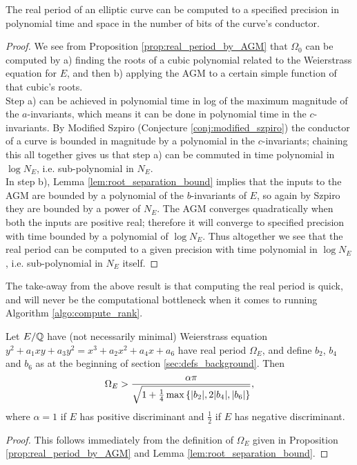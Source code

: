 \begin{corollary}[ABC]\label{cor:real_period_time_complexity}
The real period of an elliptic curve can be computed to a specified precision in polynomial time and space in the number of bits of the curve's conductor.
\end{corollary}
\begin{proof}
We see from Proposition \ref{prop:real_period_by_AGM} that $\Omega_0$ can be computed by a) finding the roots of a cubic polynomial related to the Weierstrass equation for $E$, and then b) applying the AGM to a certain simple function of that cubic's roots. \\

Step a) can be achieved in polynomial time in log of the maximum magnitude of the $a$-invariants, which means it can be done in polynomial time in the $c$-invariants. By Modified Szpiro (Conjecture \ref{conj:modified_szpiro}) the conductor of a curve is bounded in magnitude by a polynomial in the $c$-invariants; chaining this all together gives us that step a) can be commuted in time polynomial in $\log N_E$, i.e. sub-polynomial in $N_E$. \\

In step b), Lemma \ref{lem:root_separation_bound} implies that the inputs to the AGM are bounded by a polynomial of the $b$-invariants of $E$, so again by Szpiro they are bounded by a power of $N_E$. The AGM converges quadratically when both the inputs are positive real; therefore it will converge to specified precision with time bounded by a polynomial of $\log N_E$. Thus altogether we see that the real period can be computed to a given precision with time polynomial in $\log N_E$, i.e. sub-polynomial in $N_E$ itself.
\end{proof}

The take-away from the above result is that computing the real period is quick, and will never be the computational bottleneck when it comes to running Algorithm \ref{algo:compute_rank}. \\

\begin{corollary}[S.]\label{ineq:Omega_bn_bound}
Let $E/\mathbb{Q}$ have (not necessarily minimal) Weierstrass equation \\
$y^2 + a_1 xy + a_3 y^2 = x^3 + a_2 x^2 + a_4 x + a_6$ have real period $\Omega_E$, and define $b_2$, $b_4$ and $b_6$ as at the beginning of section \ref{sec:defs_background}. Then
\begin{equation}
\Omega_E > \frac{\alpha \pi}{\sqrt{1+\frac{1}{4}\max\left\{|b_2|,2|b_4|,|b_6|\right\}}},
\end{equation}
where $\alpha = 1$ if $E$ has positive discriminant and $\frac{1}{2}$ if $E$ has negative discriminant.
\end{corollary}
\begin{proof}
This follows immediately from the definition of $\Omega_E$ given in Proposition \ref{prop:real_period_by_AGM} and Lemma \ref{lem:root_separation_bound}.
\end{proof}


